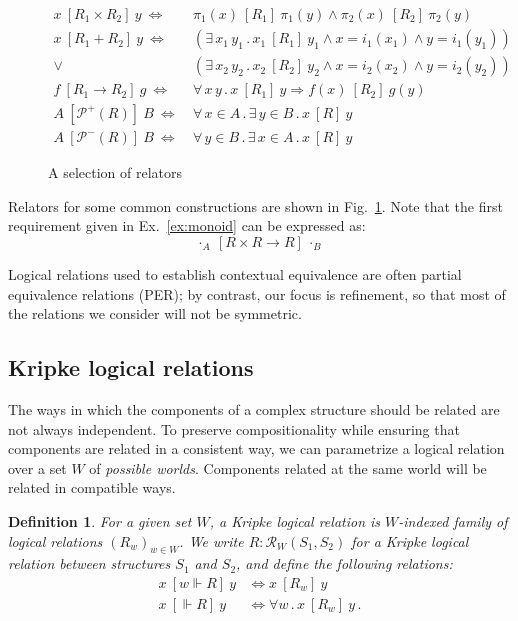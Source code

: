 \documentclass{article}
\newtheorem{definition}{Definition}
\newcommand{\ifr}[1]{\ [{#1}]\ }
\begin{document}
\begin{figure} %
  {\small
  \begin{align*}
    x \ifr{R_1 \times R_2} y \ \Leftrightarrow\  &
      \pi_1(x) \ifr{R_1} \pi_1(y) \wedge
      \pi_2(x) \ifr{R_2} \pi_2(y) \\
    x \ifr{R_1 + R_2} y \ \Leftrightarrow\  &
      (\exists \, x_1 \, y_1 \,.\,
        x_1 \ifr{R_1} y_1 \wedge
        x = i_1(x_1) \wedge
        y = i_1(y_1)) \\ \vee\ &
      (\exists \, x_2 \, y_2 \,.\,
        x_2 \ifr{R_2} y_2 \wedge
        x = i_2(x_2) \wedge
        y = i_2(y_2)) \\
    f \ifr{R_1 \rightarrow R_2} g \ \Leftrightarrow\  &
      \forall \, x \, y \,.\,
        x \ifr{R_1} y \Rightarrow
        f(x) \ifr{R_2} g(y) \\
    A \ifr{\mathcal{P}^+(R)} B \ \Leftrightarrow\  &
      \forall \, x \in A \,.\,
      \exists \, y \in B \,.\,
      x \ifr{R} y \\
    A \ifr{\mathcal{P}^-(R)} B \ \Leftrightarrow\  &
      \forall \, y \in B \,.\,
      \exists \, x \in A \,.\,
      x \ifr{R} y
  \end{align*}
  }%
  \caption{A selection of relators}
  \label{fig:relators}
\end{figure}

Relators for some common constructions are shown in Fig.~\ref{fig:relators}.
Note that the first requirement given in Ex.~\ref{ex:monoid}
can be expressed as:
\[
  \cdot_A \ifr{R \times R \rightarrow R} \cdot_B
\]

Logical relations used to establish contextual equivalence
are often partial equivalence relations (PER);
by contrast, our focus is refinement,
so that most of the relations we consider will not be symmetric.

\subsection{Kripke logical relations} %
\label{sec:klr}

The ways in which the components of a complex structure should be related
are not always independent.
To preserve compositionality while ensuring that
components are related in a consistent way,
we can parametrize a logical relation
over a set $W$ of \emph{possible worlds}.
Components related at the same world will be related
in compatible ways.

\begin{definition}
For a given set $W$,
a \emph{Kripke logical relation} is
$W$-indexed family of logical relations $(R_w)_{w \in W}$.
We write $R : \mathcal{R}_W(S_1, S_2)$
for a Kripke logical relation between structures $S_1$ and $S_2$,
and define the following relations:
\begin{align*}
  x \ifr{w \Vdash R} y &\Leftrightarrow x \ifr{R_w} y \\
  x \ifr{\Vdash R} y &\Leftrightarrow \forall w \,.\, x \ifr{R_w} y \,.
\end{align*}
\end{definition}
\end{document}
